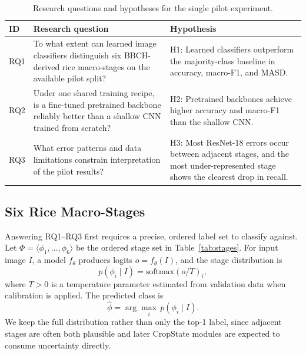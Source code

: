 \documentclass{llncs}
\begin{document}
\begin{table}[t]
\centering
\caption{Research questions and hypotheses for the single pilot experiment.}
\label{tab:rq}
\small
\begin{tabular}{p{}p{}p{}}
\toprule
\textbf{ID} & \textbf{Research question} & \textbf{Hypothesis} \\
\midrule
RQ1 & To what extent can learned image classifiers distinguish six BBCH-derived rice macro-stages on the available pilot split? &
H1: Learned classifiers outperform the majority-class baseline in accuracy, macro-F1, and MASD. \\[4pt]
RQ2 & Under one shared training recipe, is a fine-tuned pretrained backbone reliably better than a shallow CNN trained from scratch? &
H2: Pretrained backbones achieve higher accuracy and macro-F1 than the shallow CNN. \\[4pt]
RQ3 & What error patterns and data limitations constrain interpretation of the pilot results? &
H3: Most ResNet-18 errors occur between adjacent stages, and the most under-represented stage shows the clearest drop in recall. \\
\bottomrule
\end{tabular}
\end{table}

\subsection{Six Rice Macro-Stages}

Answering RQ1--RQ3 first requires a precise, ordered label set to classify against. Let $\Phi = \langle \phi_1,\dots,\phi_6 \rangle$ be the ordered stage set in Table~\ref{tab:stages}. For input image $I$, a model $f_\theta$ produces logits $o = f_\theta(I)$, and the stage distribution is
\begin{equation}
p(\phi_i \mid I) = \mathrm{softmax}(o/T)_i,
\label{eq:softmax}
\end{equation}
where $T > 0$ is a temperature parameter estimated from validation data when calibration is applied. The predicted class is
\begin{equation}
\hat{\phi} = \arg\max_i \, p(\phi_i \mid I).
\label{eq:argmax}
\end{equation}
We keep the full distribution rather than only the top-1 label, since adjacent stages are often both plausible and later CropState modules are expected to consume uncertainty directly.
\end{document}
